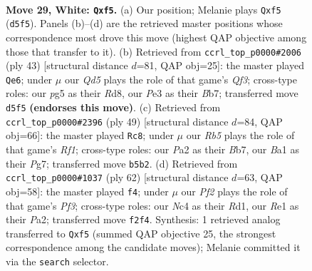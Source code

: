 \documentclass[11pt]{article}
\begin{document}
\clearpage

\begin{figure}[p]\centering
\begin{subfigure}{0.46\textwidth}\centering
\resizebox{\linewidth}{!}{%
\newchessgame
\chessboard[
  setfen={r1b3k1/1p2q2p/4r3/1R1Q1pp1/p1N1n3/4P1P1/P4PKP/B3R3 w - - 0 29},
  showmover=false,
  pgfstyle=straightmove, color=movearrow, markmove={d5-f5}
]}
\caption{}
\end{subfigure}\hfill
\begin{subfigure}{0.46\textwidth}\centering
\resizebox{\linewidth}{!}{%
\newchessgame
\chessboard[
  setfen={3r2k1/pbr2pp1/1p3q1p/n3NR2/3P4/2PB4/PQ4PP/R5K1 b - - 0 22},
  showmover=false,
  pgfstyle=straightmove, color=movearrow, markmove={f6-e6}
]}
\caption{}
\end{subfigure}
\\[4pt]
\begin{subfigure}{0.46\textwidth}\centering
\resizebox{\linewidth}{!}{%
\newchessgame
\chessboard[
  setfen={5rk1/1b1r1ppp/p3p3/1pq1P3/5R2/P1NPR2P/1P3QPK/8 b - - 2 25},
  showmover=false,
  pgfstyle=straightmove, color=movearrow, markmove={f8-c8}
]}
\caption{}
\end{subfigure}\hfill
\begin{subfigure}{0.46\textwidth}\centering
\resizebox{\linewidth}{!}{%
\newchessgame
\chessboard[
  setfen={1q2r1k1/p5b1/6p1/1p1r1pN1/3n3p/3Q1P2/PPN2RPP/3R3K w - - 0 32},
  showmover=false,
  pgfstyle=straightmove, color=movearrow, markmove={f3-f4}
]}
\caption{}
\end{subfigure}
\caption{\textbf{Move 29, White: \texttt{Qxf5}.} (a) Our position; Melanie plays \texttt{Qxf5} (\texttt{d5f5}). Panels (b)--(d) are the retrieved master positions whose correspondence most drove this move (highest QAP objective among those that transfer to it). (b) Retrieved from \texttt{ccrl\_top\_p0000\#2006} (ply 43) [structural distance $d$=81, QAP obj=25]: the master played \texttt{Qe6}; under $\mu$ our \emph{Qd5} plays the role of that game's \emph{Qf3}; cross-type roles: our \emph{p}g5 as their \emph{R}d8, our \emph{P}e3 as their \emph{B}b7; transferred move \texttt{d5f5} \textbf{(endorses this move)}. (c) Retrieved from \texttt{ccrl\_top\_p0000\#2396} (ply 49) [structural distance $d$=84, QAP obj=66]: the master played \texttt{Rc8}; under $\mu$ our \emph{Rb5} plays the role of that game's \emph{Rf1}; cross-type roles: our \emph{P}a2 as their \emph{B}b7, our \emph{B}a1 as their \emph{P}g7; transferred move \texttt{b5b2}. (d) Retrieved from \texttt{ccrl\_top\_p0000\#1037} (ply 62) [structural distance $d$=63, QAP obj=58]: the master played \texttt{f4}; under $\mu$ our \emph{Pf2} plays the role of that game's \emph{Pf3}; cross-type roles: our \emph{N}c4 as their \emph{R}d1, our \emph{R}e1 as their \emph{P}a2; transferred move \texttt{f2f4}. Synthesis: 1 retrieved analog transferred to \texttt{Qxf5} (summed QAP objective 25, the strongest correspondence among the candidate moves); Melanie committed it via the \texttt{search} selector.}
\label{fig:thought-m56}
\end{figure}
\end{document}
